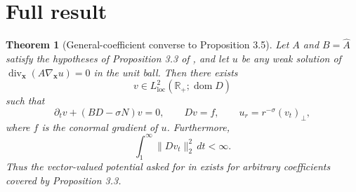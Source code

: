 \documentclass[11pt]{article}
\newtheorem{theorem}{Theorem}
\newcommand{\R}{\mathbb R}
\newcommand{\dom}{\operatorname{dom}}
\begin{document}
\section{Full result}

\begin{theorem}[General-coefficient converse to Proposition 3.5]\label{thm:main}
Let $A$ and $B=\widehat A$ satisfy the hypotheses of Proposition 3.3 of \cite{AR}, and let $u$ be any weak solution of
$\operatorname{div}_{\mathbf x}(A\nabla_{\mathbf x}u)=0$ in the unit ball. Then there exists
\[
 v\in L^2_{\mathrm{loc}}(\R_+;\dom D)
\]
such that
\[
 \partial_t v+(BD-\sigma N)v=0,
 \qquad Dv=f,
 \qquad u_r=r^{-\sigma}(v_t)_\perp,
\]
where $f$ is the conormal gradient of $u$. Furthermore,
\[
 \int_1^\infty\|Dv_t\|_2^2\,dt<\infty.
\]
Thus the vector-valued potential asked for in \cite[p.~16]{AR} exists for arbitrary coefficients covered by Proposition 3.3.
\end{theorem}
\end{document}
